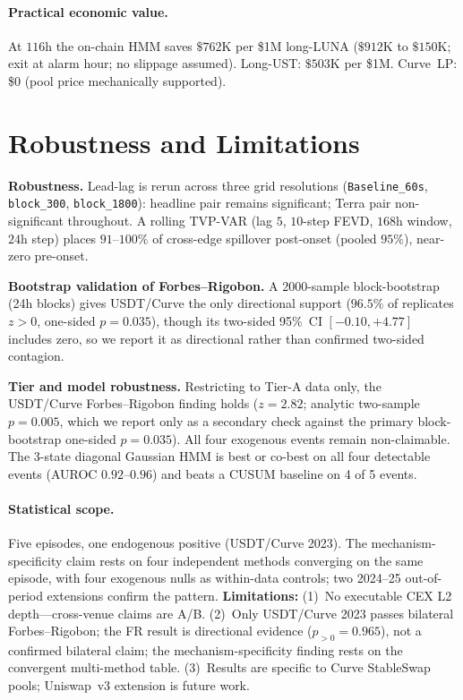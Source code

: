 \documentclass[sigconf,anonymous]{acmart}
\begin{document}
\paragraph{Practical economic value.}
At $116$h the on-chain HMM saves $\$762\text{K}$ per \$1M long-LUNA ($\$912\text{K}$ to $\$150\text{K}$; exit at alarm hour; no slippage assumed). Long-UST: $\$503\text{K}$ per \$1M. Curve~LP: \$0 (pool price mechanically supported).

\FloatBarrier


\section{Robustness and Limitations}
\label{sec:robust}

\textbf{Robustness.}
Lead-lag is rerun across three grid resolutions (\texttt{Baseline\_60s}, \texttt{block\_300}, \texttt{block\_1800}): headline pair remains significant; Terra pair non-significant throughout.
A rolling TVP-VAR (lag $5$, $10$-step FEVD, $168$h window, $24$h step) places $91$--$100\%$ of cross-edge spillover post-onset (pooled $95\%$), near-zero pre-onset.

\textbf{Bootstrap validation of Forbes--Rigobon.}
A 2000-sample block-bootstrap (24h blocks) gives USDT/Curve the only directional support
($96.5\%$ of replicates $z>0$, one-sided $p=0.035$), though its two-sided 95\%~CI $[-0.10,+4.77]$
includes zero, so we report it as directional rather than confirmed two-sided contagion.

\textbf{Tier and model robustness.}  Restricting to Tier-A data only, the USDT/Curve Forbes--Rigobon finding holds ($z=2.82$; analytic two-sample $p=0.005$, which we report only as a secondary check against the primary block-bootstrap one-sided $p=0.035$). All four exogenous events remain non-claimable.  The 3-state diagonal Gaussian HMM is best or co-best on all four detectable events (AUROC $0.92$--$0.96$) and beats a CUSUM baseline on 4 of 5 events.



\label{sec:limitations}
\paragraph{Statistical scope.}
Five episodes, one endogenous positive (USDT/Curve 2023). The mechanism-specificity
claim rests on four independent methods converging on the same episode, with four
exogenous nulls as within-data controls; two 2024--25 out-of-period extensions confirm
the pattern. \textbf{Limitations:} (1)~No executable CEX L2 depth---cross-venue claims
are A/B. (2)~Only USDT/Curve 2023 passes bilateral Forbes--Rigobon; the FR result is
directional evidence ($p_{>0}=0.965$), not a confirmed bilateral claim; the
mechanism-specificity finding rests on the convergent multi-method table. (3)~Results
are specific to Curve StableSwap pools; Uniswap~v3 extension is future work.
\end{document}
